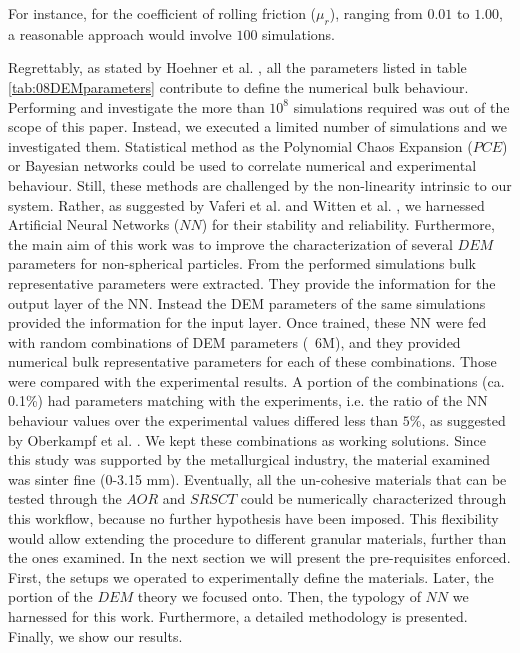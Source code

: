 For instance, for the coefficient of rolling friction ($\mu_r$), ranging from
$0.01$ to $1.00$, a reasonable approach would involve $100$ simulations.

Regrettably, as stated by Hoehner et al. \cite{RefWorks:86}, all the parameters listed in table \ref{tab:08DEMparameters}
contribute to define the numerical bulk behaviour. Performing and investigate the 
more than $10^8$ simulations required was out of the scope of this paper.
Instead, we executed a limited number of simulations and we investigated them. 
Statistical method as the Polynomial Chaos Expansion ($PCE$) or Bayesian
networks could be used to correlate numerical and experimental behaviour. 
Still, these methods are challenged by the non-linearity intrinsic to our system. 
Rather, as suggested by Vaferi et al. \cite{RefWorks:150} and Witten et al.
\cite{RefWorks:174}, we harnessed Artificial Neural Networks ($NN$) for their
stability and reliability.
Furthermore, the main aim of this work was to improve the characterization 
of several $DEM$ parameters for non-spherical particles. 
From the performed simulations bulk representative parameters were extracted. 
They provide the information for the output layer of the NN. Instead the DEM 
parameters of the same simulations provided the information for the input layer. 
Once trained, these NN were fed with random combinations of DEM parameters (~6M), 
and they provided numerical bulk representative parameters for each of these combinations. 
Those were compared with the experimental results. A portion of the combinations
(ca. 0.1\%)
had parameters matching with the experiments, i.e. the ratio of the NN behaviour
values over the experimental values differed less than $5\%$, as suggested by
Oberkampf et al. \cite{RefWorks:160}.
We kept these combinations as working solutions.
Since this study was supported by the metallurgical industry, the material examined was  sinter fine (0-3.15 mm).
Eventually, all the un-cohesive materials that can be tested through the $AOR$
and $SRSCT$ could be numerically characterized through this workflow, because no
further hypothesis have been imposed.
This flexibility would allow extending the procedure to different granular materials, further than the ones examined.
In the next section we will present the pre-requisites enforced. 
First, the setups we operated to experimentally define the materials. 
Later, the portion of the $DEM$ theory we focused onto. 
Then, the typology of $NN$ we harnessed for this work. 
Furthermore, a detailed methodology is presented. Finally, we show our results.
